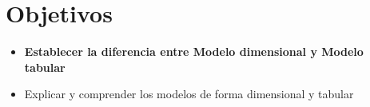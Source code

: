 \documentclass[twoside,twocolumn]{article}
\begin{document}
\section{Objetivos}

\begin{itemize}
\item 

\textbf{Establecer la diferencia entre Modelo dimensional y Modelo tabular}
\\
\item Explicar y comprender los modelos de forma dimensional y tabular



\end{itemize}


\end{document}
